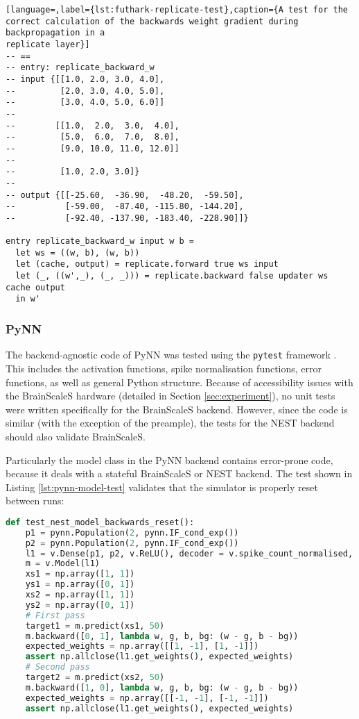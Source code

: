 \begin{minipage}{\linewidth}
\begin{lstlisting}[language=,label={lst:futhark-replicate-test},caption={A test for the
correct calculation of the backwards weight gradient during backpropagation in a
replicate layer}]
-- ==
-- entry: replicate_backward_w
-- input {[[1.0, 2.0, 3.0, 4.0],
--         [2.0, 3.0, 4.0, 5.0],
--         [3.0, 4.0, 5.0, 6.0]]
--
--        [[1.0,  2.0,  3.0,  4.0],
--         [5.0,  6.0,  7.0,  8.0],
--         [9.0, 10.0, 11.0, 12.0]]
--
--         [1.0, 2.0, 3.0]}
--
-- output {[[-25.60,  -36.90,  -48.20,  -59.50],
--          [-59.00,  -87.40, -115.80, -144.20],
--          [-92.40, -137.90, -183.40, -228.90]]}

entry replicate_backward_w input w b =
  let ws = ((w, b), (w, b))
  let (cache, output) = replicate.forward true ws input
  let (_, ((w',_), (_, _))) = replicate.backward false updater ws cache output
  in w'
\end{lstlisting}
\end{minipage}

\subsubsection{PyNN}
The backend-agnostic code of PyNN was tested using the \texttt{pytest} framework
\cite{pytest2018}.
This includes the activation functions, spike normalisation functions, error functions, 
as well as general Python structure.
Because of accessibility issues with the BrainScaleS hardware
(detailed in Section \ref{sec:experiment}), no unit tests were written specifically for the
BrainScaleS backend.
However, since the code is similar (with the exception of the preample), the tests for the 
NEST backend should also validate BrainScaleS.

Particularly the model class in the PyNN backend contains error-prone code, because it
deals with a stateful BrainScaleS or NEST backend.
The test shown in Listing \ref{lst:pynn-model-test} validates that the simulator is
properly reset between runs:

\begin{lstlisting}[language=Python,label={lst:pynn-model-test},caption={Unit test for
PyNN model to validate that the model correctly updates weights}]
def test_nest_model_backwards_reset():
    p1 = pynn.Population(2, pynn.IF_cond_exp())
    p2 = pynn.Population(2, pynn.IF_cond_exp())
    l1 = v.Dense(p1, p2, v.ReLU(), decoder = v.spike_count_normalised, weights = 1)
    m = v.Model(l1)
    xs1 = np.array([1, 1])
    ys1 = np.array([0, 1])
    xs2 = np.array([1, 1])
    ys2 = np.array([0, 1])
    # First pass
    target1 = m.predict(xs1, 50)
    m.backward([0, 1], lambda w, g, b, bg: (w - g, b - bg))
    expected_weights = np.array([[1, -1], [1, -1]])
    assert np.allclose(l1.get_weights(), expected_weights)
    # Second pass
    target2 = m.predict(xs2, 50)
    m.backward([1, 0], lambda w, g, b, bg: (w - g, b - bg))
    expected_weights = np.array([[-1, -1], [-1, -1]])
    assert np.allclose(l1.get_weights(), expected_weights)
\end{lstlisting}

